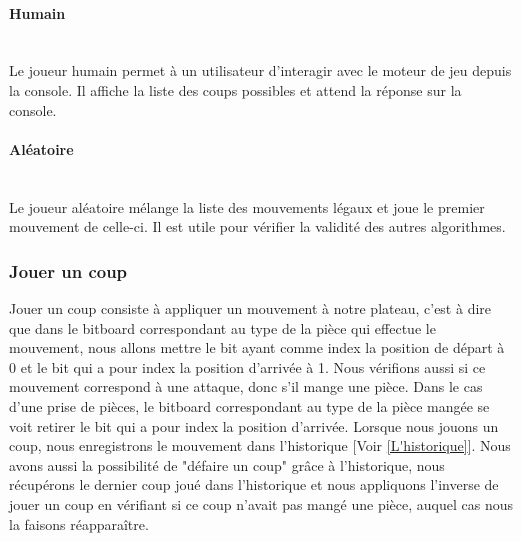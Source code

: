\documentclass{article}
\begin{document}
\paragraph{Humain}
~~\\
\newline
Le joueur humain permet à un utilisateur d'interagir avec le moteur de jeu depuis la console.
Il affiche la liste des coups possibles et attend la réponse sur la console.

\paragraph{Aléatoire}
~~\\
\newline
Le joueur aléatoire mélange la liste des mouvements légaux et joue le premier mouvement de celle-ci.
Il est utile pour vérifier la validité des autres algorithmes.

\subsubsection{Jouer un coup}\label{domove}
Jouer un coup consiste à appliquer un mouvement à notre plateau, c'est à dire que dans le bitboard correspondant au type de la pièce qui effectue le mouvement, nous allons mettre le bit ayant comme index la position de départ à 0 et le bit qui a pour index la position d'arrivée à 1.\newline 
Nous vérifions aussi si ce mouvement correspond à une attaque, donc s'il mange une pièce.\newline
Dans le cas d'une prise de pièces, le bitboard correspondant au type de la pièce mangée se voit retirer le bit qui a pour index la position d'arrivée.\newline
Lorsque nous jouons un coup, nous enregistrons le mouvement dans l'historique [Voir \ref{L'historique}].\newline
Nous avons aussi la possibilité de "défaire un coup" grâce à l'historique, nous récupérons le dernier coup joué dans l'historique et nous appliquons l'inverse de jouer un coup en vérifiant si ce coup n'avait pas mangé une pièce, auquel cas nous la faisons réapparaître.
\end{document}
